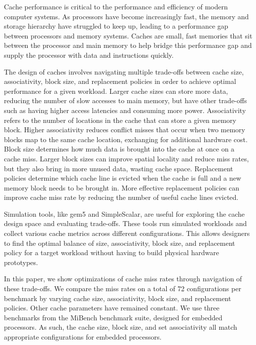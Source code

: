 \documentclass[conference]{IEEEtran}
\begin{document}
Cache performance is critical to the performance and efficiency of modern computer systems. As processors have become increasingly fast, the memory and storage hierarchy have struggled to keep up, leading to a performance gap between processors and memory systems. Caches are small, fast memories that sit between the processor and main memory to help bridge this performance gap and supply the processor with data and instructions quickly\cite{hennessy_computer_2012}.

The design of caches involves navigating multiple trade-offs between cache size, associativity, block size, and replacement policies in order to achieve optimal performance for a given workload. Larger cache sizes can store more data, reducing the number of slow accesses to main memory, but have other trade-offs such as having higher access latencies and consuming more power. Associativity refers to the number of locations in the cache that can store a given memory block. Higher associativity reduces conflict misses that occur when two memory blocks map to the same cache location, exchanging for additional hardware cost. Block size determines how much data is brought into the cache at once on a cache miss. Larger block sizes can improve spatial locality and reduce miss rates, but they also bring in more unused data, wasting cache space. Replacement policies determine which cache line is evicted when the cache is full and a new memory block needs to be brought in. More effective replacement policies can improve cache miss rate by reducing the number of useful cache lines evicted\cite{hennessy_computer_2012}.

Simulation tools, like gem5\cite{10.1145/2024716.2024718} and SimpleScalar\cite{10.1145/268806.268810}, are useful for exploring the cache design space and evaluating trade-offs. These tools run simulated workloads and collect various cache metrics across different configurations. This allows designers to find the optimal balance of size, associativity, block size, and replacement policy for a target workload without having to build physical hardware prototypes.

In this paper, we show optimizations of cache miss rates through navigation of these trade-offs. We compare the miss rates on a total of 72 configurations per benchmark by varying cache size, associativity, block size, and replacement policies. Other cache parameters have remained constant. We use three benchmarks from the MiBench benchmark suite, designed for embedded processors. As such, the cache size, block size, and set associativity all match appropriate configurations for embedded processors.
\end{document}
